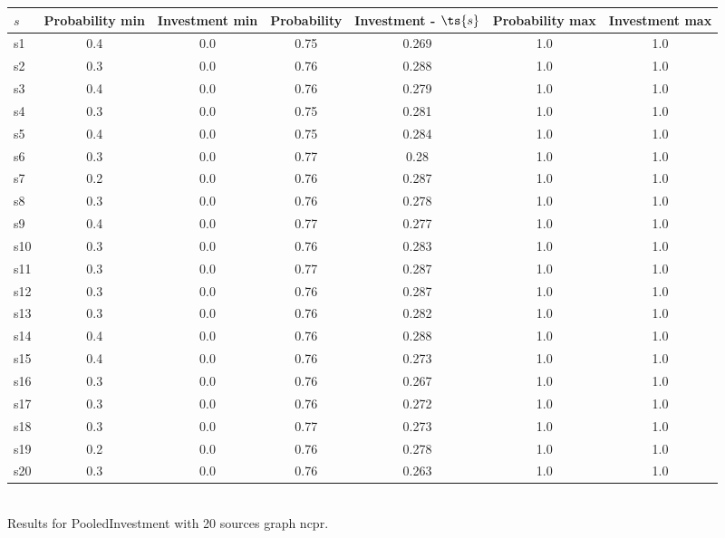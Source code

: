 \documentclass{article}
\begin{document}
\noindent\begin{tabular}{|l|c|c|c|c|c|c|}
\hline
$s$& Probability min & Investment min & Probability & Investment - $\ts{s}$ & Probability max & Investment max\\
\hline
s1 &0.4 & 0.0 & 0.75 & 0.269 & 1.0 & 1.0\\
\hline
s2 &0.3 & 0.0 & 0.76 & 0.288 & 1.0 & 1.0\\
\hline
s3 &0.4 & 0.0 & 0.76 & 0.279 & 1.0 & 1.0\\
\hline
s4 &0.3 & 0.0 & 0.75 & 0.281 & 1.0 & 1.0\\
\hline
s5 &0.4 & 0.0 & 0.75 & 0.284 & 1.0 & 1.0\\
\hline
s6 &0.3 & 0.0 & 0.77 & 0.28 & 1.0 & 1.0\\
\hline
s7 &0.2 & 0.0 & 0.76 & 0.287 & 1.0 & 1.0\\
\hline
s8 &0.3 & 0.0 & 0.76 & 0.278 & 1.0 & 1.0\\
\hline
s9 &0.4 & 0.0 & 0.77 & 0.277 & 1.0 & 1.0\\
\hline
s10 &0.3 & 0.0 & 0.76 & 0.283 & 1.0 & 1.0\\
\hline
s11 &0.3 & 0.0 & 0.77 & 0.287 & 1.0 & 1.0\\
\hline
s12 &0.3 & 0.0 & 0.76 & 0.287 & 1.0 & 1.0\\
\hline
s13 &0.3 & 0.0 & 0.76 & 0.282 & 1.0 & 1.0\\
\hline
s14 &0.4 & 0.0 & 0.76 & 0.288 & 1.0 & 1.0\\
\hline
s15 &0.4 & 0.0 & 0.76 & 0.273 & 1.0 & 1.0\\
\hline
s16 &0.3 & 0.0 & 0.76 & 0.267 & 1.0 & 1.0\\
\hline
s17 &0.3 & 0.0 & 0.76 & 0.272 & 1.0 & 1.0\\
\hline
s18 &0.3 & 0.0 & 0.77 & 0.273 & 1.0 & 1.0\\
\hline
s19 &0.2 & 0.0 & 0.76 & 0.278 & 1.0 & 1.0\\
\hline
s20 &0.3 & 0.0 & 0.76 & 0.263 & 1.0 & 1.0\\
\hline
\end{tabular}\\

\noindent Results for PooledInvestment with 20 sources graph ncpr.
\end{document}
